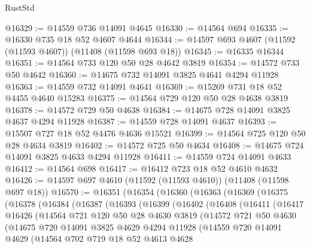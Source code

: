 \begin{lexlean}{RustStd}
\begin{coremodule}
@16329 := @14559 @736 @14091 @4645
@16330 := @14564 @694
@16335 := @16330 @735 @18 @52 @4607 @4644
@16344 := @14597 @693 @4607 (@11592 (@11593 @4607)) (@11408 (@11598 @693 @18))
@16345 := @16335 @16344
@16351 := @14564 @733 @120 @50 @28 @4642 @3819
@16354 := @14572 @733 @50 @4642
@16360 := @14675 @732 @14091 @3825 @4641 @4294 @11928
@16363 := @14559 @732 @14091 @4641
@16369 := @15269 @731 @18 @52 @4455 @4640 @15283
@16375 := @14564 @729 @120 @50 @28 @4638 @3819
@16378 := @14572 @729 @50 @4638
@16384 := @14675 @728 @14091 @3825 @4637 @4294 @11928
@16387 := @14559 @728 @14091 @4637
@16393 := @15507 @727 @18 @52 @4476 @4636 @15521
@16399 := @14564 @725 @120 @50 @28 @4634 @3819
@16402 := @14572 @725 @50 @4634
@16408 := @14675 @724 @14091 @3825 @4633 @4294 @11928
@16411 := @14559 @724 @14091 @4633
@16412 := @14564 @698
@16417 := @16412 @723 @18 @52 @4610 @4632
@16426 := @14597 @697 @4610 (@11592 (@11593 @4610)) (@11408 (@11598 @697 @18))
@16570 := @16351
    (@16354
      (@16360
        (@16363
          (@16369
            (@16375
              (@16378
                (@16384
                  (@16387
                    (@16393
                      (@16399
                        (@16402
                          (@16408
                            (@16411
                              (@16417
                                @16426
                                (@14564
                                  @721
                                  @120
                                  @50
                                  @28
                                  @4630
                                  @3819
                                  (@14572
                                    @721
                                    @50
                                    @4630
                                    (@14675
                                      @720
                                      @14091
                                      @3825
                                      @4629
                                      @4294
                                      @11928
                                      (@14559
                                        @720
                                        @14091
                                        @4629
                                        (@14564
                                          @702
                                          @719
                                          @18
                                          @52
                                          @4613
                                          @4628

\end{coremodule}
\end{lexlean}
